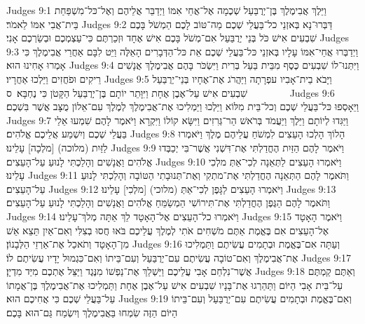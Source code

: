 Judges 9:1	וַיֵּלֶךְ אֲבִימֶלֶךְ בֶּן־יְרֻבַּעַל שְׁכֶמָה אֶל־אֲחֵי אִמּוֹ וַיְדַבֵּר אֲלֵיהֶם וְאֶל־כּל־מִשְׁפַּחַת בֵּית־אֲבִי אִמּוֹ לֵאמֹר׃
Judges 9:2	דַּבְּרוּ־נָא בְּאזְנֵי כל־בַּעֲלֵי שְׁכֶם מַה־טּוֹב לָכֶם הַמְשֹׁל בָּכֶם שִׁבְעִים אִישׁ כֹּל בְּנֵי יְרֻבַּעַל אִם־מְשֹׁל בָּכֶם אִישׁ אֶחָד וּזְכַרְתֶּם כִּי־עַצְמְכֶם וּבְשַׂרְכֶם אָנִי׃
Judges 9:3	וַיְדַבְּרוּ אֲחֵי־אִמּוֹ עָלָיו בְּאזְנֵי כּל־בַּעֲלֵי שְׁכֶם אֵת כּל־הַדְּבָרִים הָאֵלֶּה וַיֵּט לִבָּם אַחֲרֵי אֲבִימֶלֶךְ כִּי אָמְרוּ אָחִינוּ הוּא׃
Judges 9:4	וַיִּתְּנוּ־לוֹ שִׁבְעִים כֶּסֶף מִבֵּית בַּעַל בְּרִית וַיִּשְׂכֹּר בָּהֶם אֲבִימֶלֶךְ אֲנָשִׁים רֵיקִים וּפֹחֲזִים וַיֵּלְכוּ אַחֲרָיו׃
Judges 9:5	וַיָּבֹא בֵית־אָבִיו עפְרָתָה וַיַּהֲרֹג אֶת־אֶחָיו בְּנֵי־יְרֻבַּעַל שִׁבְעִים אִישׁ עַל־אֶבֶן אֶחָת וַיִּוָּתֵר יוֹתָם בֶּן־יְרֻבַּעַל הַקָּטֹן כִּי נֶחְבָּא׃ {ס}        
Judges 9:6	וַיֵּאָסְפוּ כּל־בַּעֲלֵי שְׁכֶם וְכל־בֵּית מִלּוֹא וַיֵּלְכוּ וַיַּמְלִיכוּ אֶת־אֲבִימֶלֶךְ לְמֶלֶךְ עִם־אֵלוֹן מֻצָּב אֲשֶׁר בִּשְׁכֶם׃
Judges 9:7	וַיַּגִּדוּ לְיוֹתָם וַיֵּלֶךְ וַיַּעֲמֹד בְּרֹאשׁ הַר־גְּרִזִים וַיִּשָּׂא קוֹלוֹ וַיִּקְרָא וַיֹּאמֶר לָהֶם שִׁמְעוּ אֵלַי בַּעֲלֵי שְׁכֶם וְיִשְׁמַע אֲלֵיכֶם אֱלֹהִים׃
Judges 9:8	הָלוֹךְ הָלְכוּ הָעֵצִים לִמְשֹׁחַ עֲלֵיהֶם מֶלֶךְ וַיֹּאמְרוּ לַזַּיִת (מלוכה) [מלְכָה] עָלֵינוּ׃
Judges 9:9	וַיֹּאמֶר לָהֶם הַזַּיִת הֶחֳדַלְתִּי אֶת־דִּשְׁנִי אֲשֶׁר־בִּי יְכַבְּדוּ אֱלֹהִים וַאֲנָשִׁים וְהָלַכְתִּי לָנוּעַ עַל־הָעֵצִים׃
Judges 9:10	וַיֹּאמְרוּ הָעֵצִים לַתְּאֵנָה לְכִי־אַתְּ מלְכִי עָלֵינוּ׃
Judges 9:11	וַתֹּאמֶר לָהֶם הַתְּאֵנָה הֶחֳדַלְתִּי אֶת־מתְקִי וְאֶת־תְּנוּבָתִי הַטּוֹבָה וְהָלַכְתִּי לָנוּעַ עַל־הָעֵצִים׃
Judges 9:12	וַיֹּאמְרוּ הָעֵצִים לַגָּפֶן לְכִי־אַתְּ (מלוכי) [מלְכִי] עָלֵינוּ׃
Judges 9:13	וַתֹּאמֶר לָהֶם הַגֶּפֶן הֶחֳדַלְתִּי אֶת־תִּירוֹשִׁי הַמְשַׂמֵּחַ אֱלֹהִים וַאֲנָשִׁים וְהָלַכְתִּי לָנוּעַ עַל־הָעֵצִים׃
Judges 9:14	וַיֹּאמְרוּ כל־הָעֵצִים אֶל־הָאָטָד לֵךְ אַתָּה מְלךְ־עָלֵינוּ׃
Judges 9:15	וַיֹּאמֶר הָאָטָד אֶל־הָעֵצִים אִם בֶּאֱמֶת אַתֶּם מֹשְׁחִים אֹתִי לְמֶלֶךְ עֲלֵיכֶם בֹּאוּ חֲסוּ בְצִלִּי וְאִם־אַיִן תֵּצֵא אֵשׁ מִן־הָאָטָד וְתֹאכַל אֶת־אַרְזֵי הַלְּבָנוֹן׃
Judges 9:16	וְעַתָּה אִם־בֶּאֱמֶת וּבְתָמִים עֲשִׂיתֶם וַתַּמְלִיכוּ אֶת־אֲבִימֶלֶךְ וְאִם־טוֹבָה עֲשִׂיתֶם עִם־יְרֻבַּעַל וְעִם־בֵּיתוֹ וְאִם־כִּגְמוּל יָדָיו עֲשִׂיתֶם לוֹ׃
Judges 9:17	אֲשֶׁר־נִלְחַם אָבִי עֲלֵיכֶם וַיַּשְׁלֵךְ אֶת־נַפְשׁוֹ מִנֶּגֶד וַיַּצֵּל אֶתְכֶם מִיַּד מִדְיָן׃
Judges 9:18	וְאַתֶּם קַמְתֶּם עַל־בֵּית אָבִי הַיּוֹם וַתַּהַרְגוּ אֶת־בָּנָיו שִׁבְעִים אִישׁ עַל־אֶבֶן אֶחָת וַתַּמְלִיכוּ אֶת־אֲבִימֶלֶךְ בֶּן־אֲמָתוֹ עַל־בַּעֲלֵי שְׁכֶם כִּי אֲחִיכֶם הוּא׃
Judges 9:19	וְאִם־בֶּאֱמֶת וּבְתָמִים עֲשִׂיתֶם עִם־יְרֻבַּעַל וְעִם־בֵּיתוֹ הַיּוֹם הַזֶּה שִׂמְחוּ בַּאֲבִימֶלֶךְ וְיִשְׂמַח גַּם־הוּא בָּכֶם׃
